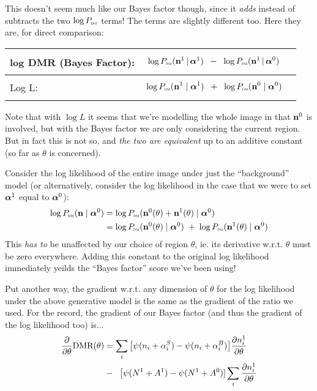 \documentclass[12pt]{article}
\begin{document}
This doesn't seem much like our Bayes factor though, since it
\emph{adds} instead of subtracts the two $\log P_\text{\tiny\sc dm}$ terms! The terms
are slightly different too.  Here they are, for direct comparison:

\begin{tabular}{|l|l|}
\hline
log DMR (Bayes Factor): & 
\parbox{.7\textwidth}{
\begin{align*}
&\log P_\text{\tiny\sc dm}(\mathbf{n}^1 \,|\, \boldsymbol\alpha^1) \;\;-\;\; \log P_\text{\tiny\sc dm}(\mathbf{n}^1 \,|\, \boldsymbol\alpha^0)
\end{align*}
} \\
\hline
Log L: & 
\parbox{.7\textwidth}{
\begin{align*}
& \log P_\text{\tiny\sc dm}(\mathbf{n}^1 \mid \boldsymbol\alpha^1) \;\; + \;\; \log P_\text{\tiny\sc dm}(\mathbf{n}^0 \mid \boldsymbol\alpha^0)
\end{align*}
} \\
\hline
\end{tabular}

Note that with $\log L$ it seems that we're modelling the whole image
in that $\mathbf{n}^0$ is involved, but with the Bayes factor we are only
considering the current region. But in fact this is not so, and {\it
  the two are equivalent} up to an additive constant (so far as
$\theta$ is concerned).

Consider the log likelihood of the entire image under just the
``background'' model (or alternatively, consider the log likelihood in the case that we were to set $\boldsymbol\alpha^1$ equal to $\boldsymbol\alpha^0$):
\begin{align*}
\log P_\text{\tiny\sc dm}(\mathbf{n} \mid \boldsymbol\alpha^0) 
&= \log P_\text{\tiny\sc dm}(\mathbf{n}^0(\theta) + \mathbf{n}^1(\theta) \mid \boldsymbol\alpha^0)  \\
&= \log P_\text{\tiny\sc dm}(\mathbf{n}^0(\theta) \mid \boldsymbol\alpha^0) \; + \; \log P_\text{\tiny\sc dm}(\mathbf{n}^1(\theta) \mid \boldsymbol\alpha^0) 
\end{align*}
This \emph{has to} be unaffected by our choice of region $\theta$,
ie. its derivative w.r.t. $\theta$ must be zero everywhere.  Adding
this constant to the original log likelihood immediately yeilds the
``Bayes factor'' score we've been using!

Put another way, the gradient w.r.t. any dimension of $\theta$ for the
log likelihood under the above generative model is the same as the
gradient of the ratio we used.  For the record, the gradient of our
Bayes factor (and thus the gradient of the log likelihood too) is...
\begin{align}
\frac{\partial}{\partial\theta}\text{DMR}(\theta) 
&= \sum_i \big[ \psi(n_i + \alpha^S_i) - \psi(n_i + \alpha^B_i) \big] \frac{\partial n^1_i}{\partial\theta} \notag\\
& - \;\; \big[\psi(N^1+A^1) - \psi(N^1+A^0)]\sum_i \frac{\partial n^1_i}{\partial\theta}
\end{align}
\end{document}
